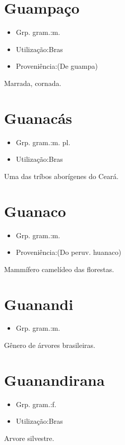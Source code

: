 \section{Guampaço}
\begin{itemize}
\item {Grp. gram.:m.}
\end{itemize}
\begin{itemize}
\item {Utilização:Bras}
\end{itemize}
\begin{itemize}
\item {Proveniência:(De \textunderscore guampa\textunderscore )}
\end{itemize}
Marrada, cornada.
\section{Guanacás}
\begin{itemize}
\item {Grp. gram.:m. pl.}
\end{itemize}
\begin{itemize}
\item {Utilização:Bras}
\end{itemize}
Uma das tríbos aborígenes do Ceará.
\section{Guanaco}
\begin{itemize}
\item {Grp. gram.:m.}
\end{itemize}
\begin{itemize}
\item {Proveniência:(Do peruv. \textunderscore huanaco\textunderscore )}
\end{itemize}
Mammífero camelídeo das florestas.
\section{Guanandi}
\begin{itemize}
\item {Grp. gram.:m.}
\end{itemize}
Gênero de árvores brasileiras.
\section{Guanandirana}
\begin{itemize}
\item {Grp. gram.:f.}
\end{itemize}
\begin{itemize}
\item {Utilização:Bras}
\end{itemize}
Arvore silvestre.
